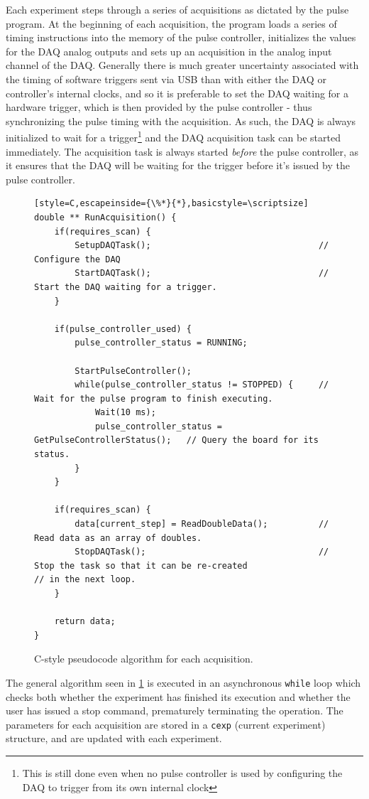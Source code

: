 \documentclass[PaulGanssle-Thesis.tex]{subfiles}
\begin{document}
Each experiment steps through a series of acquisitions as dictated by the pulse program. At the beginning of each acquisition, the program loads a series of timing instructions into the memory of the pulse controller, initializes the values for the DAQ analog outputs and sets up an acquisition in the analog input channel of the DAQ. Generally there is much greater uncertainty associated with the timing of software triggers sent via USB than with either the DAQ or controller's internal clocks, and so it is preferable to set the DAQ waiting for a hardware trigger, which is then provided by the pulse controller - thus synchronizing the pulse timing with the acquisition. As such, the DAQ is always initialized to wait for a trigger\footnote{This is still done even when no pulse controller is used by configuring the DAQ to trigger from its own internal clock} and the DAQ acquisition task can be started immediately. The acquisition task is always started \textit{before} the pulse controller, as it ensures that the DAQ will be waiting for the trigger before it's issued by the pulse controller.

\begin{figure}[h!]

\begin{lstlisting}[style=C,escapeinside={\%*}{*},basicstyle=\scriptsize]
double ** RunAcquisition() {
	if(requires_scan) {
		SetupDAQTask();									// Configure the DAQ
		StartDAQTask();									// Start the DAQ waiting for a trigger.
	}
			
	if(pulse_controller_used) {
		pulse_controller_status = RUNNING;				
		
		StartPulseController();							
		while(pulse_controller_status != STOPPED) {		// Wait for the pulse program to finish executing.
			Wait(10 ms);								
			pulse_controller_status = GetPulseControllerStatus();	// Query the board for its status.
		}
	}
	
	if(requires_scan) {
		data[current_step] = ReadDoubleData();			// Read data as an array of doubles.
		StopDAQTask();									// Stop the task so that it can be re-created																		// in the next loop.
	}		
			
	return data;
}
\end{lstlisting}

\caption{C-style pseudocode algorithm for each acquisition.}
\label{fig:AcquisitionPseudocode2}
\end{figure}

The general algorithm seen in \ref{fig:AcquisitionPseudocode2} is executed in an asynchronous \lstinline|while| loop which checks both whether the experiment has finished its execution and whether the user has issued a stop command, prematurely terminating the operation. The parameters for each acquisition are stored in a \lstinline|cexp| (current experiment) structure, and are updated with each experiment.
\end{document}
